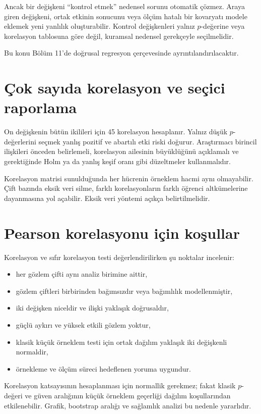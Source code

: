 Ancak bir değişkeni ``kontrol etmek'' nedensel sorunu otomatik çözmez. Araya
giren değişkeni, ortak etkinin sonucunu veya ölçüm hatalı bir kovaryatı modele
eklemek yeni yanlılık oluşturabilir. Kontrol değişkenleri yalnız $p$-değerine
veya korelasyon tablosuna göre değil, kuramsal nedensel gerekçeyle seçilmelidir.

Bu konu Bölüm 11'de doğrusal regresyon çerçevesinde ayrıntılandırılacaktır.

\section{Çok sayıda korelasyon ve seçici raporlama}

On değişkenin bütün ikilileri için 45 korelasyon hesaplanır. Yalnız düşük
$p$-değerlerini seçmek yanlış pozitif ve abartılı etki riski doğurur.
Araştırmacı birincil ilişkileri önceden belirlemeli, korelasyon ailesinin
büyüklüğünü açıklamalı ve gerektiğinde Holm ya da yanlış keşif oranı gibi
düzeltmeler kullanmalıdır.

Korelasyon matrisi sunulduğunda her hücrenin örneklem hacmi aynı olmayabilir.
Çift bazında eksik veri silme, farklı korelasyonların farklı öğrenci
altkümelerine dayanmasına yol açabilir. Eksik veri yöntemi açıkça
belirtilmelidir.

\section{Pearson korelasyonu için koşullar}

Korelasyon ve sıfır korelasyon testi değerlendirilirken şu noktalar incelenir:

\begin{itemize}
  \item her gözlem çifti aynı analiz birimine aittir,
  \item gözlem çiftleri birbirinden bağımsızdır veya bağımlılık modellenmiştir,
  \item iki değişken niceldir ve ilişki yaklaşık doğrusaldır,
  \item güçlü aykırı ve yüksek etkili gözlem yoktur,
  \item klasik küçük örneklem testi için ortak dağılım yaklaşık iki değişkenli normaldir,
  \item örnekleme ve ölçüm süreci hedeflenen yoruma uygundur.
\end{itemize}

Korelasyon katsayısının hesaplanması için normallik gerekmez; fakat klasik
$p$-değeri ve güven aralığının küçük örneklem geçerliği dağılım koşullarından
etkilenebilir. Grafik, bootstrap aralığı ve sağlamlık analizi bu nedenle
yararlıdır.


